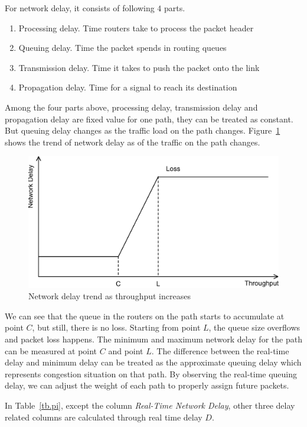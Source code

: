 For network delay, it consists of following $4$ parts.

\begin{enumerate}
\item Processing delay. Time routers take to process the packet header
\item Queuing delay. Time the packet spends in routing queues
\item Transmission delay. Time it takes to push the packet onto the link
\item Propagation delay. Time for a signal to reach its destination
\end{enumerate}

Among the four parts above, processing delay, transmission delay and propagation delay are fixed value for one path, they can be treated as constant. But queuing delay changes as the traffic load on the path changes. Figure~\ref{fig.delay} shows the trend of network delay as of the traffic on the path changes.

\begin{figure}
\centering
\includegraphics[width=0.8\linewidth]{fig/delay.eps}
\caption{Network delay trend as throughput increases}
\label{fig.delay}
\end{figure}

We can see that the queue in the routers on the path starts to accumulate at point $C$, but still, there is no loss. Starting from point $L$, the queue size overflows and packet loss happens. The minimum and maximum network delay for the path can be measured at point $C$ and point $L$. The difference between the real-time delay and minimum delay can be treated as the approximate queuing delay which represents congestion situation on that path. By observing the real-time queuing delay, we can adjust the weight of each path to properly assign future packets.

In Table~\ref{tb.pi}, except the column \emph{Real-Time Network Delay}, other three delay related columns are calculated through real time delay $D$.

